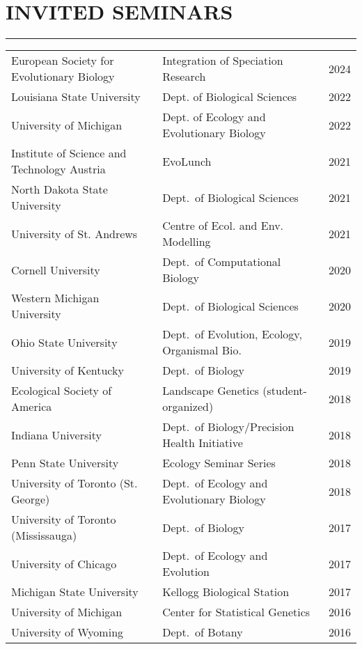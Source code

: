 \documentclass{gbcv}
\begin{document}
\section*{INVITED SEMINARS}
\vspace{-0.6cm}
\rule{470pt}{0.4pt}
%
\begin{longtable}{>{\everypar{\hangindent1cm}}p{}p{}p{}}
%
European Society for Evolutionary Biology & Integration of Speciation Research & \hfill 2024\\
%
Louisiana State University & Dept. of Biological Sciences & \hfill 2022 \\
%
University of Michigan & Dept. of Ecology and Evolutionary Biology & \hfill 2022 \\
%
Institute of Science and Technology Austria & EvoLunch & \hfill 2021 \\
%
North Dakota State University & Dept.\ of Biological Sciences & \hfill 2021 \\
%
University of St. Andrews & Centre of Ecol. and Env. Modelling & \hfill 2021 \\
%
Cornell University & Dept.\ of Computational Biology & \hfill 2020 \\
%
Western Michigan University & Dept.\ of Biological Sciences & \hfill 2020 \\
%
Ohio State University & Dept.\ of Evolution, Ecology, Organismal Bio. & \hfill 2019 \\
%
University of Kentucky & Dept.\ of Biology & \hfill 2019 \\
%
Ecological Society of America & Landscape Genetics (student-organized) & \hfill 2018 \\
%
Indiana University & Dept.\ of Biology/Precision Health Initiative & \hfill 2018 \\
%
Penn State University & Ecology Seminar Series & \hfill 2018 \\
%
University of Toronto (St. George) & Dept.\ of Ecology and Evolutionary Biology & \hfill 2018 \\
%
University of Toronto (Mississauga) & Dept.\ of Biology & \hfill 2017 \\
%
University of Chicago & Dept.\ of Ecology and Evolution & \hfill 2017 \\
%
Michigan State University & Kellogg Biological Station & \hfill 2017 \\
%
University of Michigan & Center for Statistical Genetics & \hfill 2016 \\
%
University of Wyoming & Dept.\ of Botany & \hfill 2016 \\

\end{longtable}
\end{document}
